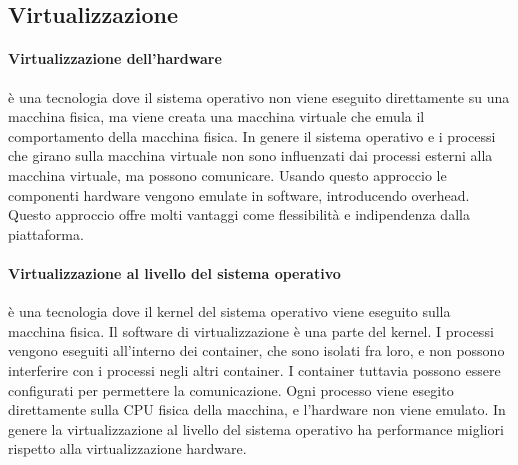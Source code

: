 \subsection{Virtualizzazione}
\paragraph{Virtualizzazione dell'hardware}
\`e una tecnologia dove il sistema operativo non viene eseguito direttamente su una macchina fisica, ma viene creata una macchina virtuale che emula il comportamento della macchina fisica. In genere il sistema operativo e i processi che girano sulla macchina virtuale non sono influenzati dai processi esterni alla macchina virtuale, ma possono comunicare.
Usando questo approccio le componenti hardware vengono emulate in software, introducendo overhead.
Questo approccio offre molti vantaggi come flessibilit\`a e indipendenza dalla piattaforma.
\paragraph{Virtualizzazione al livello del sistema operativo}
\`e una tecnologia dove il kernel del sistema operativo viene eseguito sulla macchina fisica. Il software di virtualizzazione \`e una parte del kernel. I processi vengono eseguiti all'interno dei container, che sono isolati fra loro, e non possono interferire con i processi negli altri container. I container tuttavia possono essere configurati per permettere la comunicazione.
Ogni processo viene esegito direttamente sulla CPU fisica della macchina, e l'hardware non viene emulato.
In genere la virtualizzazione al livello del sistema operativo ha performance migliori rispetto alla virtualizzazione hardware.

